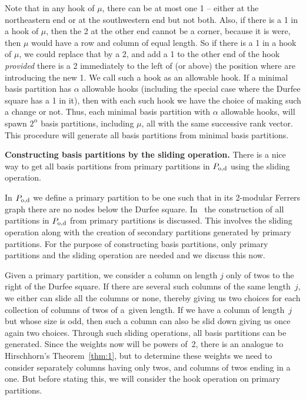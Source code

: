\documentclass[10pt,a4paper]{amsart}
\numberwithin{equation}{section}
\theoremstyle{definition}
\begin{document}
Note that in any hook of $\mu$, there can be at most one 1 -- either at the
northeastern end or at the southwestern end but not both. Also, if there is
a 1 in a hook of $\mu$, then the 2 at the other end cannot be a corner, because
it is were, then $\mu$ would have a row and column of equal length. So if
there is a 1 in a hook of $\mu$, we could replace that by a 2, and add a 1
to the other end of the hook {\it provided} there is a 2 immediately
to the left of (or above) the position where are introducing the new 1. We call
such a hook as an allowable hook. If a minimal basis partition has $\alpha$
allowable hooks (including the special case where the Durfee square has a 1
in it), then with each such hook we have the choice of making such a change
or not. Thus, each minimal basis partition with $\alpha$ allowable hooks, will
spawn $2^{\alpha}$ basis partitions, including $\mu$, all with the same
successive rank vector. This procedure will generate all basis
partitions from minimal basis partitions.

{\bf Constructing basis partitions by the sliding operation.}
There is a nice way to get all basis partitions from primary partitions in
$P_{\rm o,d}$ using the sliding operation.

In $P_{\rm o,d}$ we define a primary partition to be one such that in its 2-modular
Ferrers graph there are no nodes below the Durfee square. In~\cite{Al2016} the
construction of all partitions in $P_{\rm o,d}$ from primary partitions is
discussed. This involves the sliding operation along with the creation of
secondary partitions generated by primary partitions. For the purpose
of constructing basis partitions, only primary partitions and the sliding
operation are needed and we discuss this now.

Given a primary partition, we consider a column on length $j$ only of twos
to the right of the Durfee square.
If there are several such columns of the same length~$j$, we either can slide
all the columns or none, thereby giving us two choices for each collection
of columns of twos of a~given length. If we have a column of length~$j$ but
whose
size is odd, then such a column can also be slid down giving us once again
two choices. Through such sliding operations, all basis partitions can be
generated. Since the weights now will be powers of~2, there is an analogue to
Hirschhorn's Theorem~\ref{thm:1},
but to determine these weights we need to consider separately columns
having only twos, and columns of twos ending in a one.
But before stating this, we will
consider the hook operation on primary partitions.
\end{document}
